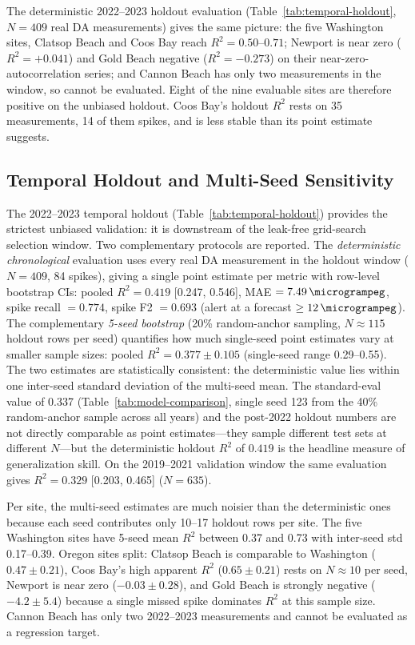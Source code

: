 \documentclass[toxins,article,submit,moreauthors]{Definitions/mdpi}
\begin{document}
The deterministic 2022--2023 holdout evaluation (Table~\ref{tab:temporal-holdout}, $N = 409$ real DA measurements) gives the same picture: the five Washington sites, Clatsop Beach and Coos Bay reach $R^2 = 0.50$--$0.71$; Newport is near zero ($R^2 = +0.041$) and Gold Beach negative ($R^2 = -0.273$) on their near-zero-autocorrelation series; and Cannon Beach has only two measurements in the window, so cannot be evaluated. Eight of the nine evaluable sites are therefore positive on the unbiased holdout. Coos Bay's holdout $R^2$ rests on 35 measurements, 14 of them spikes, and is less stable than its point estimate suggests.

\subsection{Temporal Holdout and Multi-Seed Sensitivity}
\label{sec:results-temporal-holdout}

The 2022--2023 temporal holdout (Table~\ref{tab:temporal-holdout}) provides the strictest unbiased validation: it is downstream of the leak-free grid-search selection window. Two complementary protocols are reported. The \emph{deterministic chronological} evaluation uses every real DA measurement in the holdout window ($N = 409$, 84 spikes), giving a single point estimate per metric with row-level bootstrap CIs: pooled $R^2 = 0.419$ [0.247, 0.546], MAE $= \SI{7.49}{\microgrampeg}$, spike recall $= 0.774$, spike F2 $= 0.693$ (alert at a forecast $\geq \SI{12}{\microgrampeg}$). The complementary \emph{5-seed bootstrap} (20\% random-anchor sampling, $N \approx 115$ holdout rows per seed) quantifies how much single-seed point estimates vary at smaller sample sizes: pooled $R^2 = 0.377 \pm 0.105$ (single-seed range 0.29--0.55). The two estimates are statistically consistent: the deterministic value lies within one inter-seed standard deviation of the multi-seed mean. The standard-eval value of 0.337 (Table~\ref{tab:model-comparison}, single seed 123 from the 40\% random-anchor sample across all years) and the post-2022 holdout numbers are not directly comparable as point estimates---they sample different test sets at different $N$---but the deterministic holdout $R^2$ of $0.419$ is the headline measure of generalization skill. On the 2019--2021 validation window the same evaluation gives $R^2 = 0.329$ [0.203, 0.465] ($N = 635$).

Per site, the multi-seed estimates are much noisier than the deterministic ones because each seed contributes only 10--17 holdout rows per site. The five Washington sites have 5-seed mean $R^2$ between 0.37 and 0.73 with inter-seed std 0.17--0.39. Oregon sites split: Clatsop Beach is comparable to Washington ($0.47 \pm 0.21$), Coos Bay's high apparent $R^2$ ($0.65 \pm 0.21$) rests on $N \approx 10$ per seed, Newport is near zero ($-0.03 \pm 0.28$), and Gold Beach is strongly negative ($-4.2 \pm 5.4$) because a single missed spike dominates $R^2$ at this sample size. Cannon Beach has only two 2022--2023 measurements and cannot be evaluated as a regression target.
\end{document}

